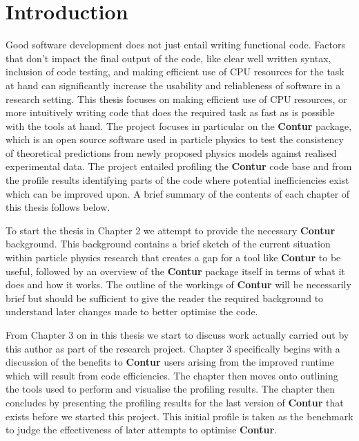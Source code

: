 \chapter{Introduction}
\label{chapterlabel1}

Good software development does not just entail writing functional code. Factors that don't impact the final output of the code, like clear well written syntax, inclusion of code testing, and making efficient use of CPU resources for the task at hand can significantly increase the usability and reliableness of software in a research setting. This thesis focuses on making efficient use of CPU resources, or more intuitively writing code that does the required task as fast as is possible with the tools at hand. The project focuses in particular on the \textbf{Contur} package, which is an open source software used in particle physics to test the consistency of theoretical predictions from newly proposed physics models against realised experimental data. The project entailed profiling the \textbf{Contur}  code base and from the profile results identifying parts of the code where potential inefficiencies exist which can be improved upon. A brief summary of the contents of each chapter of this thesis follows below.

To start the thesis in Chapter 2 we attempt to provide the necessary \textbf{Contur} background. This background contains a brief sketch of the current situation within particle physics research that creates a gap for a tool like \textbf{Contur} to be useful, followed by an overview of the \textbf{Contur}  package itself in terms of what it does and how it works. The outline of the workings of \textbf{Contur}  will be necessarily brief but should be sufficient to give the reader the required background to understand later changes made to better optimise the code.

From Chapter 3 on in this thesis we start to discuss work actually carried out by this author as part of the research project. Chapter 3 specifically begins with a discussion of the benefits to \textbf{Contur} users arising from the improved runtime which will result from code efficiencies. The chapter then moves onto outlining the tools used to perform and visualise the profiling results. The chapter then concludes by presenting the profiling results for the last version of \textbf{Contur} that exists before we started this project. This initial profile is taken as the benchmark to judge the effectiveness of later attempts to optimise \textbf{Contur}.

